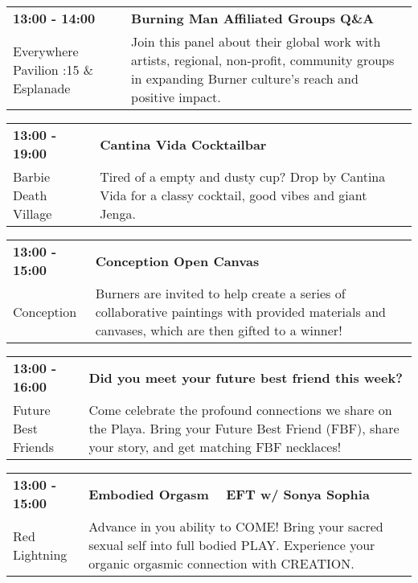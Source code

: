 \begin{tabular}{ p{1in} p{2.2in} }
    \textbf{13:00 - 14:00} & \textbf{Burning Man Affiliated Groups Q\&A} \\
    Everywhere Pavilion \newline 6:15 \& Esplanade & Join this panel about their global work with artists, regional, non-profit, community groups in expanding Burner culture's reach and positive impact. \\
    \hline 
\end{tabular}
    
\begin{tabular}{ p{1in} p{2.2in} }
    \textbf{13:00 - 19:00} & \textbf{Cantina Vida Cocktailbar} \\
    Barbie Death Village \newline  & Tired of a empty and dusty cup? Drop by Cantina Vida for a classy cocktail, good vibes and giant Jenga. \\
    \hline 
\end{tabular}
    
\begin{tabular}{ p{1in} p{2.2in} }
    \textbf{13:00 - 15:00} & \textbf{Conception Open Canvas} \\
    Conception \newline  & Burners are invited to help create a series of collaborative paintings with provided materials and canvases, which are then gifted to a winner! \\
    \hline 
\end{tabular}
    
\begin{tabular}{ p{1in} p{2.2in} }
    \textbf{13:00 - 16:00} & \textbf{Did you meet your future best friend this week?} \\
    Future Best Friends \newline  & Come celebrate the profound connections we share on the Playa. Bring your Future Best Friend (FBF), share your story, and get matching FBF necklaces! \\
    \hline 
\end{tabular}
    
\begin{tabular}{ p{1in} p{2.2in} }
    \textbf{13:00 - 15:00} & \textbf{Embodied Orgasm ~ EFT w/ Sonya Sophia} \\
    Red Lightning \newline  & Advance in you ability to COME! Bring your sacred sexual self into full bodied PLAY. Experience your organic orgasmic connection with CREATION. \\
    \hline 
\end{tabular}
    
